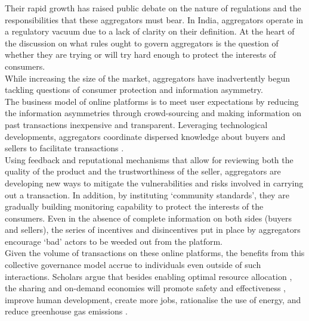 \documentclass[a4paper, 12pt, twoside]{article}
\begin{document}
                  Their rapid growth has raised public debate on the nature of regulations and the responsibilities that these aggregators must bear. In India, aggregators operate in a regulatory vacuum due to a lack of clarity on their definition. At the heart of the discussion on what rules ought to govern aggregators is the question of whether they are trying or will try hard enough to protect the interests of consumers.\\

                   While increasing the size of the market, aggregators have inadvertently begun tackling questions of consumer protection and information asymmetry.\\
                     
                     The business model of online platforms is to meet user expectations by reducing the information asymmetries through crowd-sourcing and making information on past transactions inexpensive and transparent. Leveraging technological developments, aggregators coordinate dispersed knowledge about buyers and sellers to facilitate transactions \parencite{thierer2015internet}. \\
                    
                    Using feedback and reputational mechanisms that allow for reviewing both the quality of the product and the trustworthiness of the seller, aggregators are developing new ways to mitigate the vulnerabilities and risks involved in carrying out a transaction. In addition, by instituting ‘community standards’, they are gradually building monitoring capability to protect the interests of the consumers. Even in the absence of complete information on both sides (buyers and sellers), the series of incentives and disincentives put in place by aggregators encourage ‘bad’ actors to be weeded out from the platform. \\
                    
                  Given the volume of transactions on these online platforms, the benefits from this collective governance model accrue to individuals even outside of such interactions. Scholars argue that besides enabling optimal resource allocation \parencite{hamari2016sharing}, the sharing and on-demand economies will promote safety and effectiveness \parencite{feeney2015ridesharing}, improve human development, create more jobs, rationalise the use of energy, and reduce greenhouse gas emissions \parencite{wu2016impact}.

 
                    
\end{document}
